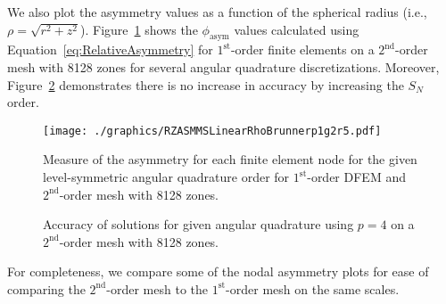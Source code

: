 \documentclass[12pt,letterpaper]{article}
\begin{document}
We also plot the asymmetry values as a function of the spherical radius (i.e., $\rho=\sqrt{r^2+z^2}$). Figure~\ref{fig:RZASMMSLinearRhoBrunnerp1g2r5Nodes} shows the $\phi_\text{asym}$ values calculated using Equation~\ref{eq:RelativeAsymmetry} for $1^\text{st}$-order finite elements on a $2^\text{nd}$-order mesh with 8128 zones for several angular quadrature discretizations. Moreover, Figure~\ref{fig:RZASMMSLinearRhoBrunnerp4g2r5Accuracy} demonstrates there is no increase in accuracy by increasing the $S_N$ order.

\begin{figure}[!htb]
\centering
\texttt{[image: ./graphics/RZASMMSLinearRhoBrunnerp1g2r5.pdf]}
\caption{Measure of the asymmetry for each finite element node for the given level-symmetric angular quadrature order for $1^\text{st}$-order DFEM and $2^\text{nd}$-order mesh with 8128 zones.}
\label{fig:RZASMMSLinearRhoBrunnerp1g2r5Nodes}
\end{figure}

\begin{figure}[!htb]
\centering
{}
\caption{Accuracy of solutions for given angular quadrature using $p=4$ on a $2^\text{nd}$-order mesh with 8128 zones.}
\label{fig:RZASMMSLinearRhoBrunnerp4g2r5Accuracy}
\end{figure}

\FloatBarrier

\label{sub:AxiSymSummaryDiscussion}
For completeness, we compare some of the nodal asymmetry plots for ease of comparing the $2^\text{nd}$-order mesh to the $1^\text{st}$-order mesh on the same scales.
\end{document}

